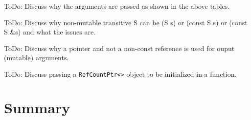 ToDo: Discuss why the arguments are passed as shown in the above
tables.

ToDo: Discuss why non-mutable transitive S can be (S s) or (const S s)
or (const S \&s) and what the issues are.

ToDo: Discuss why a pointer and not a non-const reference is used for
ouput (mutable) arguments.

ToDo: Discuss passing a \texttt{RefCountPtr<>} object to be initialized in a
function.

%
\section{Summary}
%
